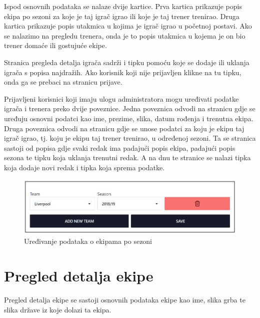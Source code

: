 \documentclass[times, utf8, zavrsni]{fer}
\begin{document}
Ispod osnovnih podataka se nalaze dvije kartice. Prva kartica prikazuje popis ekipa po sezoni za koje je taj igrač igrao ili koje je taj trener trenirao.
Druga kartica prikazuje popis utakmica u kojima je igrač igrao u početnoj postavi. Ako se nalazimo na pregledu trenera, onda je to popis utakmica u kojema je on bio trener domaće ili gostujuće ekipe.

Stranica pregleda detalja igrača sadrži i tipku pomoću koje se dodaje ili uklanja igrača s popisa najdražih. Ako korisnik koji nije prijavljen klikne na tu tipku, onda ga se prebaci na stranicu prijave.

Prijavljeni korisnici koji imaju ulogu administratora mogu uređivati podatke igrača i trenera preko dvije poveznice.
Jedna poveznica odvodi na stranicu gdje se uređuju osnovni podatci kao ime, prezime, slika, datum rođenja i trenutna ekipa.
Druga poveznica odvodi na stranicu gdje se unose podatci za koju je ekipu taj igrač igrao, tj. koju je ekipu taj trener trenirao, u određenoj sezoni.
Ta se stranica sastoji od popisa gdje svaki redak ima padajući popis ekipa, padajući popis sezona te tipku koja uklanja trenutni redak.
A na dnu te stranice se nalazi tipka koja dodaje novi redak i tipka koja sprema podatke.

\begin{figure}[htb]
\centering
\includegraphics[width=14cm]{images/per-season.jpg}
\caption{Uređivanje podataka o ekipama po sezoni}
\label{fig:per-season}
\end{figure}

\newpage
\section{Pregled detalja ekipe}

Pregled detalja ekipe se sastoji osnovnih podataka ekipe kao ime, slika grba te slika države iz koje dolazi ta ekipa.
\end{document}
